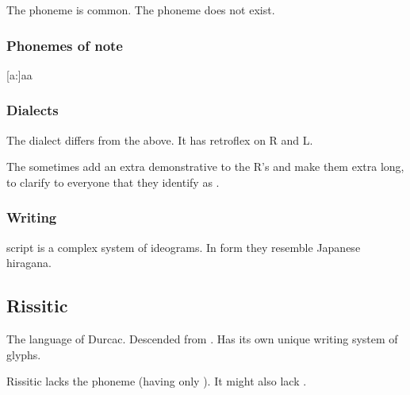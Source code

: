 The phoneme \txipa{[T]} is common. 
The phoneme \txipa{[p]} does not exist. 









\begin{pronunciationenvironment}{\subsubsection{Phonemes of note}}
  \pitem{\ahresphan}   {[a:]}{aa}
  \pitem{\aflatresphan}{[\ae]}{\aumlaut}
\end{pronunciationenvironment}





\subsubsection{Dialects}
The \Mystraacht{} dialect differs from the above. 
It has retroflex on R and L. 

The \CiriathSepher{} sometimes add an extra demonstrative  to the R's and make them extra long, to clarify to everyone that they identify as \CiriathSepher. 





\subsubsection{Writing}
\Resphan{} script is a complex system of ideograms. 
In form they resemble Japanese hiragana. 









\subsection{Rissitic}
The language of Durcac. 
Descended from \Shurco{}. 
Has its own unique writing system of glyphs. 

Rissitic lacks the phoneme \txipa{[x]} (having only \txipa{[\c c]}). 
It might also lack \txipa{[l]}. 





